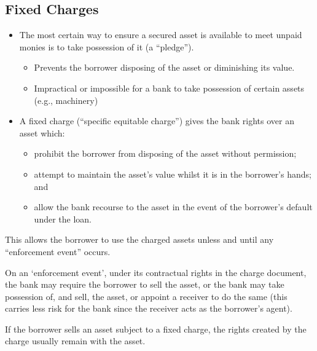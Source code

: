 \documentclass[
]{article}
\newenvironment{Shaded}{}{}
\newcommand{\NormalTok}[1]{#1}
\providecommand{\tightlist}{%
  \setlength{\itemsep}{0pt}\setlength{\parskip}{0pt}}
\begin{document}
\hypertarget{fixed-charges}{%
\subsection{Fixed Charges}\label{fixed-charges}}

\begin{itemize}
\tightlist
\item
  The most certain way to ensure a secured asset is available to meet
  unpaid monies is to take possession of it (a ``pledge'').

  \begin{itemize}
  \tightlist
  \item
    Prevents the borrower disposing of the asset or diminishing its
    value.
  \item
    Impractical or impossible for a bank to take possession of certain
    assets (e.g., machinery)
  \end{itemize}
\item
  A fixed charge (``specific equitable charge'') gives the bank rights
  over an asset which:

  \begin{itemize}
  \tightlist
  \item
    prohibit the borrower from disposing of the asset without
    permission;\\
  \item
    attempt to maintain the asset's value whilst it is in the borrower's
    hands; and\\
  \item
    allow the bank recourse to the asset in the event of the borrower's
    default under the loan.
  \end{itemize}
\end{itemize}

This allows the borrower to use the charged assets unless and until any
``enforcement event'' occurs.

On an `enforcement event', under its contractual rights in the charge
document, the bank may require the borrower to sell the asset, or the
bank may take possession of, and sell, the asset, or appoint a receiver
to do the same (this carries less risk for the bank since the receiver
acts as the borrower's agent).

\begin{Shaded}
\begin{Highlighting}[]
\NormalTok{If the borrower sells an asset subject to a fixed charge, the rights created by the charge usually remain with the asset.}
\end{Highlighting}
\end{Shaded}
\end{document}
